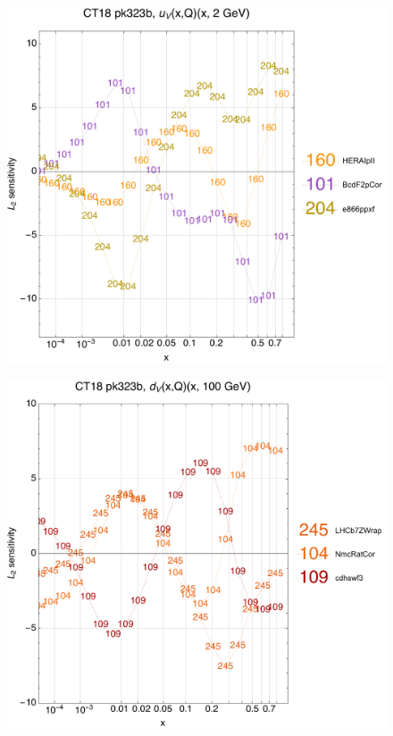 \documentclass[10pt,aps,prd,floatfix,titlepage]{revtex4}
\begin{document}
\begin{figure}
\includegraphics[width=\textwidth,height=0.44\textheight,keepaspectratio]{2/rat_ifl1_ct18nn_L2_q2_Sf_2.pdf}
\caption{}
\end{figure}
\clearpage
\begin{figure}
\includegraphics[width=\textwidth,height=0.44\textheight,keepaspectratio]{2/rat_ifl2_ct18nn_L2_q100_Sf_2.pdf}
\caption{}
\end{figure}
\end{document}
